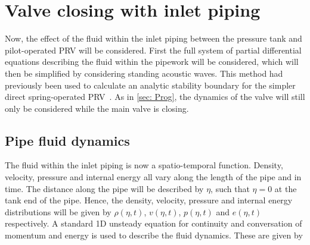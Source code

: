 \chapter{Valve closing with inlet piping} \label{sec: QWM}

Now, the effect of the fluid within the inlet piping between the pressure tank and pilot-operated PRV will be considered.
First the full system of partial differential equations describing the fluid within the pipework will be considered, which will then be simplified by considering standing acoustic waves.
This method had previously been used to calculate an analytic stability boundary for the simpler direct spring-operated PRV~\cite{Hos2015ModelPipe,Hos2015DynamicModelling,Hos2016DynamicService,Hos2017DynamicRecommendations}. As in \cref{sec: Prog}, the dynamics of the valve will still only be considered while the main valve is closing.


\section{Pipe fluid dynamics}

The fluid within the inlet piping is now a spatio-temporal function. Density, velocity, pressure and internal energy all vary along the length of the pipe and in time. The distance along the pipe will be described by $\eta$, such that $\eta = 0$ at the tank end of the pipe. Hence, the density, velocity, pressure and internal energy distributions will be given by $\rho(\eta,t)$, $v(\eta,t)$, $p(\eta,t)$ and $e(\eta,t)$ respectively.
A standard 1D unsteady equation for continuity and conversation of momentum and energy is used to describe the fluid dynamics. These are given by

